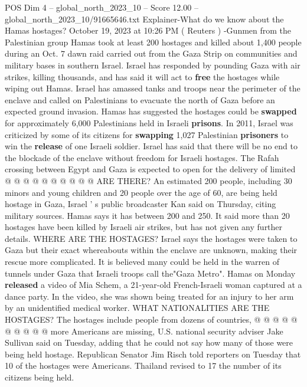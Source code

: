 \begin{textsample}{POS Dim 4 – global\_north\_2023\_10 – Score 12.00 – global\_north\_2023\_10/91665646.txt}  \label{ex:f4_pos_449}
Explainer-What do we know about the Hamas hostages?
October 19, 2023 at 10:26 PM ( Reuters ) -Gunmen from the Palestinian group Hamas took at least 200 hostages and killed about 1,400 people during an Oct. 7 dawn raid carried out from the Gaza Strip on communities and military bases in southern Israel.
Israel has responded by pounding Gaza with air strikes, killing thousands, and has said it will act to \textbf{free} the hostages while wiping out Hamas.
Israel has amassed tanks and troops near the perimeter of the enclave and called on Palestinians to evacuate the north of Gaza before an expected ground invasion.
Hamas has suggested the hostages could be \textbf{swapped} for approximately 6,000 Palestinians held in Israeli \textbf{prisons}.
In 2011, Israel was criticized by some of its citizens for \textbf{swapping} 1,027 Palestinian \textbf{prisoners} to win the \textbf{release} of one Israeli soldier.
Israel has said that there will be no end to the blockade of the enclave without freedom for Israeli hostages.
The Rafah crossing between Egypt and Gaza is expected to open for the delivery of limited @ @ @ @ @ @ @ @ @ @ ARE THERE?
An estimated 200 people, including 30 minors and young children and 20 people over the age of 60, are being held hostage in Gaza, Israel ' s public broadcaster Kan said on Thursday, citing military sources.
Hamas says it has between 200 and 250.
It said more than 20 hostages have been killed by Israeli air strikes, but has not given any further details.
WHERE ARE THE HOSTAGES?
Israel says the hostages were taken to Gaza but their exact whereabouts within the enclave are unknown, making their rescue more complicated.
It is believed many could be held in the warren of tunnels under Gaza that Israeli troops call the"Gaza Metro".
Hamas on Monday \textbf{released} a video of Mia Schem, a 21-year-old French-Israeli woman captured at a dance party.
In the video, she was shown being treated for an injury to her arm by an unidentified medical worker.
WHAT NATIONALITIES ARE THE HOSTAGES?
The hostages include people from dozens of countries, @ @ @ @ @ @ @ @ @ @ more Americans are missing, U.S. national security adviser Jake Sullivan said on Tuesday, adding that he could not say how many of those were being held hostage.
Republican Senator Jim Risch told reporters on Tuesday that 10 of the hostages were Americans.
Thailand revised to 17 the number of its citizens being held.

\end{textsample}
